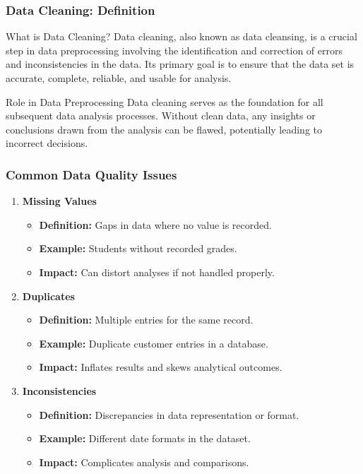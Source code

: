\documentclass[aspectratio=169]{beamer}
\begin{document}
\begin{frame}[fragile]
    \frametitle{Data Cleaning: Definition}
    \begin{block}{What is Data Cleaning?}
    Data cleaning, also known as data cleansing, is a crucial step in data preprocessing involving the identification and correction of errors and inconsistencies in the data. Its primary goal is to ensure that the data set is accurate, complete, reliable, and usable for analysis.
    \end{block}

    \begin{block}{Role in Data Preprocessing}
    Data cleaning serves as the foundation for all subsequent data analysis processes. Without clean data, any insights or conclusions drawn from the analysis can be flawed, potentially leading to incorrect decisions.
    \end{block}
\end{frame}

\begin{frame}[fragile]
    \frametitle{Common Data Quality Issues}
    \begin{enumerate}
        \item \textbf{Missing Values}
        \begin{itemize}
            \item \textbf{Definition:} Gaps in data where no value is recorded.
            \item \textbf{Example:} Students without recorded grades.
            \item \textbf{Impact:} Can distort analyses if not handled properly.
        \end{itemize}
        
        \item \textbf{Duplicates}
        \begin{itemize}
            \item \textbf{Definition:} Multiple entries for the same record.
            \item \textbf{Example:} Duplicate customer entries in a database.
            \item \textbf{Impact:} Inflates results and skews analytical outcomes.
        \end{itemize}
        
        \item \textbf{Inconsistencies}
        \begin{itemize}
            \item \textbf{Definition:} Discrepancies in data representation or format.
            \item \textbf{Example:} Different date formats in the dataset.
            \item \textbf{Impact:} Complicates analysis and comparisons.
        \end{itemize}
    \end{enumerate}
\end{frame}
\end{document}

